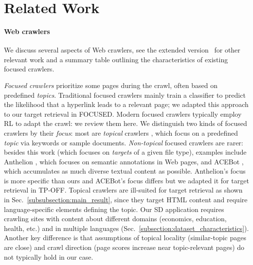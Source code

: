\section{Related Work}\label{section:related_work}
\paragraph*{Web crawlers} We discuss several aspects of Web
crawlers, see the extended version~\cite{github_repository} for other relevant work and a summary table outlining the characteristics 
 of existing focused crawlers. \begin{asparaenum} 

\item \emph{Focused crawlers} prioritize some pages during the crawl, often based on predefined \emph{topics}. Traditional focused crawlers \cite{chakrabarti1999focused,diligenti2000focused} mainly train a classifier to predict the likelihood that a hyperlink leads to a relevant page; we adapted this approach to our target retrieval in \textsf{\small FOCUSED}. Modern focused crawlers typically employ RL to adapt the crawl: we review them here. We distinguish two kinds of focused crawlers by their \emph{focus}: most are \emph{topical} crawlers \cite{gouriten2014scalable,han2018focused,zhang2021dsdd,kontogiannis2022tree}, which focus on a predefined \emph{topic} via keywords or sample documents. \emph{Non-topical} focused crawlers are rarer: besides this work (which focuses on \emph{targets} of a given file type), examples include \textsf{\small Anthelion} \cite{meusel2014focused}, which focuses on semantic annotations in Web pages, and \textsf{\small ACEBot} \cite{faheem2015adaptive}, which accumulates as much diverse textual content as possible. Anthelion's focus is more specific than ours and ACEBot's focus differs but we adapted it for target retrieval in \textsf{\small TP-OFF}. 
Topical crawlers are ill-suited for target retrieval as shown in Sec.~\ref{subsubsection:main_result}, since they target HTML content and require language-specific elements defining the topic. %
Our SD application requires crawling sites with content about different domains (economics, education, health, etc.) and in multiple languages (Sec.~\ref{subsection:dataset_characteristics}). Another key difference is that assumptions of topical locality \cite{10.1145/345508.345597} (similar-topic pages are close) and crawl direction \cite{han2018focused} (page scores increase near topic-relevant pages) do not typically hold in our case.

\end{asparaenum}
